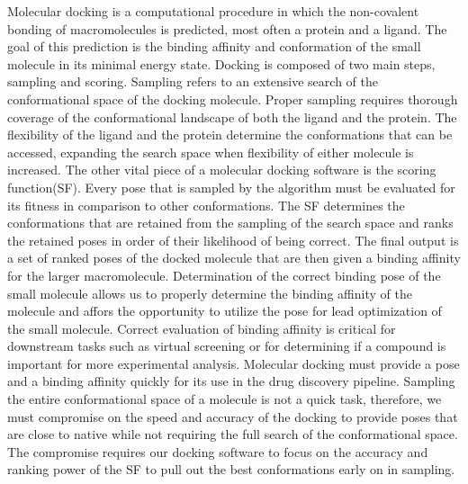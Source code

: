 \documentclass[journal=jcisd8,manuscript=article]{achemso}
\begin{document}
Molecular docking is a computational procedure in which the non-covalent bonding of macromolecules is predicted, most often a protein and a ligand. The goal of this prediction is the binding affinity and conformation of the small molecule in its minimal energy state. Docking is composed of two main steps, sampling and scoring. Sampling refers to an extensive search of the conformational space of the docking molecule. Proper sampling requires thorough coverage of the conformational landscape of both the ligand and the protein. The flexibility of the ligand and the protein determine the conformations that can be accessed, expanding the search space when flexibility of either molecule is increased. The other vital piece of a molecular docking software is the scoring function(SF). Every pose that is sampled by the algorithm must be evaluated for its fitness in comparison to other conformations. The SF determines the conformations that are retained from the sampling of the search space and ranks the retained poses in order of their likelihood of being correct. The final output is a set of ranked poses of the docked molecule that are then given a binding affinity for the larger macromolecule. Determination of the correct binding pose of the small molecule allows us to properly determine the binding affinity of the molecule and affors the opportunity to utilize the pose for lead optimization of the small molecule. Correct evaluation of binding affinity is critical for downstream tasks such as virtual screening or for determining if a compound is important for more experimental analysis. Molecular docking must provide a pose and a binding affinity quickly for its use in the drug discovery pipeline. Sampling the entire conformational space of a molecule is not a quick task, therefore, we must compromise on the speed and accuracy of the docking to provide poses that are close to native while not requiring the full search of the conformational space. The compromise requires our docking software to focus on the accuracy and ranking power of the SF to pull out the best conformations early on in sampling.
\end{document}

